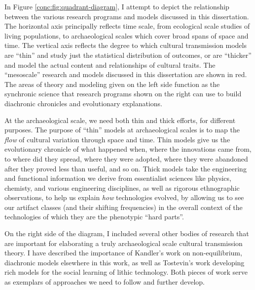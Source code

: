 In Figure \ref{conc:fig:quadrant-diagram}, I attempt to depict the relationship between the various research programs and models discussed in this dissertation.  The horizontal axis principally reflects time scale, from ecological scale studies of living populations, to archaeological scales which cover broad spans of space and time.  The vertical axis reflects the degree to which cultural transmission models are ``thin'' and study just the statistical distribution of outcomes, or are ``thicker'' and model the actual content and relationships of cultural traits.  The ``mesoscale'' research and  models discussed in this dissertation are shown in red.  The areas of theory and modeling given on the left side function as the synchronic science that research programs shown on the right can use to build diachronic chronicles and evolutionary explanations. 

At the archaeological scale, we need both thin and thick efforts, for different purposes.  The purpose of ``thin'' models at archaeological scales is to map the \emph{flow} of cultural variation through space and time.  Thin models give us the evolutionary chronicle of what happened when, where the innovations came from, to where did they spread, where they were adopted, where they were abandoned after they proved less than useful, and so on.  Thick models take the engineering and functional information we derive from essentialist sciences like physics, chemisty, and various engineering disciplines, as well as rigorous ethnographic observations, to help us explain \emph{how} technologies evolved, by allowing us to see our artifact classes (and their shifting frequencies) in the overall context of the technologies of which they are the phenotypic ``hard parts''.  

On the right side of the diagram, I included several other bodies of research that are important for elaborating a truly archaeological scale cultural transmission theory.  I have described the importance of Kandler's \citeyearpar{Kandler2013} work on non-equilibrium, diachronic models elsewhere in this work, as well as Tostevin's \citeyearpar{tostevin2012seeing,tostevin2019content} work developing rich models for the social learning of lithic technology.  Both pieces of work serve as exemplars of approaches we need to follow and further develop.

